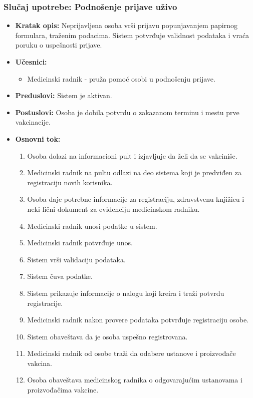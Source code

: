 \documentclass[titlepage]{article}
\begin{document}
\subsubsection{Slučaj upotrebe: Podnošenje prijave uživo}
\begin{itemize}
    \item \textbf{Kratak opis:} Neprijavljena osoba vrši prijavu popunjavanjem papirnog formulara, traženim podacima. Sistem potvrđuje validnost podataka i vraća poruku o uspešnosti prijave.
    \item \textbf{Učesnici:}
        \begin{itemize}
	    \item Medicinski radnik - pruža pomoć osobi u podnošenju prijave.
	\end{itemize}
    \item \textbf{Preduslovi:} Sistem je aktivan.
    \item \textbf{Postuslovi:} Osoba je dobila potvrdu o zakazanom terminu i mestu prve vakcinacije.
    \item \textbf{Osnovni tok:}
        \begin{enumerate}
            \item Osoba dolazi na informacioni pult i izjavljuje da želi da se vakciniše.
	    \item Medicinski radnik na pultu odlazi na deo sistema koji je predviđen za registraciju novih korisnika.
	    \item Osoba daje potrebne informacije za registraciju, zdravstvenu knjižicu i neki lični dokument za evidenciju medicinskom radniku.
	    \item Medicinski radnik unosi podatke u sistem.
	    \item Medicinski radnik potvrđuje unos.
	    \item Sistem vrši validaciju podataka.
            \item Sistem čuva podatke.
            \item Sistem prikazuje informacije o nalogu koji kreira i traži potvrdu registracije.
	    \item Medicinski radnik nakon provere podataka potvrđuje registraciju osobe.
            \item Sistem obaveštava da je osoba uspešno registrovana.
	    \item Medicinski radnik od osobe traži da odabere ustanove i proizvođače vakcina.
	    \item Osoba obaveštava medicinskog radnika o odgovarajućim ustanovama i proizvođačima vakcine.

\end{enumerate}
\end{itemize}
\end{document}
